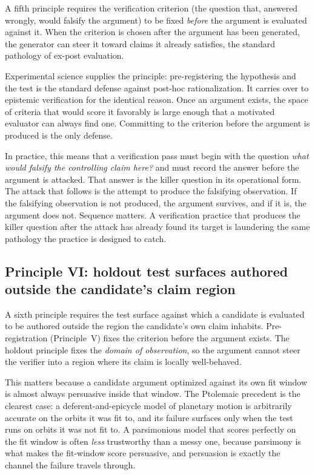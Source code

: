 \documentclass[
  11pt,
]{article}
\begin{document}
A fifth principle requires the verification criterion (the question that,
answered wrongly, would falsify the argument) to be fixed \emph{before} the
argument is evaluated against it. When the criterion is chosen after the
argument has been generated, the generator can steer it toward claims it
already satisfies, the standard pathology of ex-post evaluation.

Experimental science supplies the principle: pre-registering the
hypothesis and the test is the standard defense against post-hoc
rationalization. It carries over to epistemic verification for the
identical reason. Once an argument exists, the space of criteria that
would score it favorably is large enough that a motivated evaluator can
always find one. Committing to the criterion before the argument is
produced is the only defense.

In practice, this means that a verification pass must begin with the
question \emph{what would falsify the controlling claim here?} and must
record the answer before the argument is attacked. That answer is the
killer question in its operational form. The attack that follows is the
attempt to produce the falsifying observation. If the falsifying
observation is not produced, the argument survives, and if it is, the
argument does not. Sequence matters. A verification practice that produces
the killer question after the attack has already found its target is
laundering the same pathology the practice is designed to catch.

\subsection{Principle VI: holdout test surfaces authored outside the
candidate's claim
region}\label{principle-vi-holdout-test-surfaces-authored-outside-the-candidates-claim-region}

A sixth principle requires the test surface against which a candidate is
evaluated to be authored outside the region the candidate's own claim
inhabits. Pre-registration (Principle~V) fixes the criterion before the
argument exists. The holdout principle fixes the \emph{domain of
observation}, so the argument cannot steer the verifier into a region
where its claim is locally well-behaved.

This matters because a candidate argument optimized against its own
fit window is almost always persuasive inside that window. The Ptolemaic
precedent is the clearest case: a deferent-and-epicycle model of planetary
motion is arbitrarily accurate on the orbits it was fit to, and its
failure surfaces only when the test runs on orbits it was not fit to. A
parsimonious model that scores perfectly on the fit window
is often \emph{less} trustworthy than a messy one, because parsimony is
what makes the fit-window score persuasive, and persuasion is exactly the
channel the failure travels through.
\end{document}
